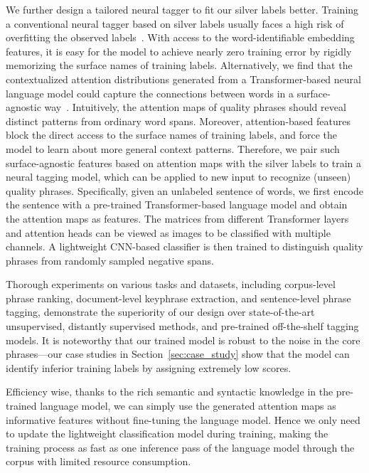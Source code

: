 \documentclass[sigconf]{acmart}
\begin{document}
We further design a tailored neural tagger to fit our silver labels better. 
Training a conventional neural tagger based on silver labels usually faces a high risk of overfitting the observed labels~\cite{liang2020bond}.
With access to the word-identifiable embedding features, it is easy for the model to achieve nearly zero training error by rigidly memorizing the surface names of training labels.
Alternatively, we find that the contextualized attention distributions generated from a Transformer-based neural language model could capture the connections between words in a surface-agnostic way~\cite{kim2019pre}.
Intuitively, the attention maps of quality phrases should reveal distinct patterns from ordinary word spans.
Moreover, attention-based features block the direct access to the surface names of training labels, and force the model to learn about more general context patterns.
Therefore, we pair such surface-agnostic features based on attention maps with the silver labels to train a neural tagging model, which can be applied to new input to recognize (unseen) quality phrases.
Specifically, given an unlabeled sentence of  words, we first encode the sentence with a pre-trained Transformer-based language model and obtain the attention maps as features.
The  matrices from different Transformer layers and attention heads can be viewed as images to be classified with multiple channels.
A lightweight CNN-based classifier is then trained to distinguish quality phrases from randomly sampled negative spans.

Thorough experiments on various tasks and datasets, including corpus-level phrase ranking, document-level keyphrase extraction, and sentence-level phrase tagging, demonstrate the superiority of our design over state-of-the-art unsupervised, distantly supervised methods, and pre-trained off-the-shelf tagging models.
It is noteworthy that our trained model is robust to the noise in the core phrases---our case studies in Section~\ref{sec:case_study} show that the model can identify inferior training labels by assigning extremely low scores.

Efficiency wise, thanks to the rich semantic and syntactic knowledge in the pre-trained language model, we can simply use the generated attention maps as informative features without fine-tuning the language model.
Hence we only need to update the lightweight classification model during training, making the training process as fast as one inference pass of the language model through the corpus with limited resource consumption.
\end{document}
